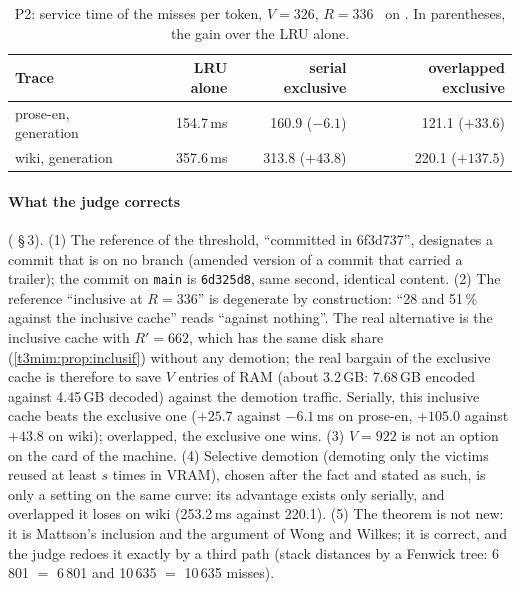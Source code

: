 \begin{table}[tbp]
\centering\small
\caption[P2: service time of the misses per token]{P2: service time of the misses per token, $V = 326$, $R = 336$ \calc~on \mes. In parentheses, the gain over the LRU alone.}
\label{t3mim:tab:p2-temps}
\begin{tabular}{@{}lrrr@{}}
\toprule
Trace & LRU alone & serial exclusive & overlapped exclusive \\
\midrule
prose-en, generation & 154.7\,ms & 160.9 ($-6.1$) & 121.1 ($+33.6$) \\
wiki, generation & 357.6\,ms & 313.8 ($+43.8$) & 220.1 ($+137.5$) \\
\bottomrule
\end{tabular}
\end{table}

\paragraph{What the judge corrects} ( §\,3). (1) The reference of the threshold, ``committed in 6f3d737'', designates a commit that is on no branch (amended version of a commit that carried a trailer); the commit on \texttt{main} is \texttt{6d325d8}, same second, identical content. (2) The reference ``inclusive at $R = 336$'' is degenerate by construction: ``28 and 51\,\% against the inclusive cache'' reads ``against nothing''. The real alternative is the inclusive cache with $R' = 662$, which has the same disk share (\cref{t3mim:prop:inclusif}) without any demotion; the real bargain of the exclusive cache is therefore to save $V$ entries of RAM (about 3.2\,GB: 7.68\,GB encoded against 4.45\,GB decoded) against the demotion traffic. Serially, this inclusive cache beats the exclusive one ($+25.7$ against $-6.1$\,ms on prose-en, $+105.0$ against $+43.8$ on wiki); overlapped, the exclusive one wins. (3) $V = 922$ is not an option on the card of the machine. (4) Selective demotion (demoting only the victims reused at least $s$ times in VRAM), chosen after the fact and stated as such, is only a setting on the same curve: its advantage exists only serially, and overlapped it loses on wiki (253.2\,ms against 220.1). (5) The theorem is not new: it is Mattson's inclusion and the argument of Wong and Wilkes; it is correct, and the judge redoes it exactly by a third path (stack distances by a Fenwick tree: 6\,801 $=$ 6\,801 and 10\,635 $=$ 10\,635 misses).

